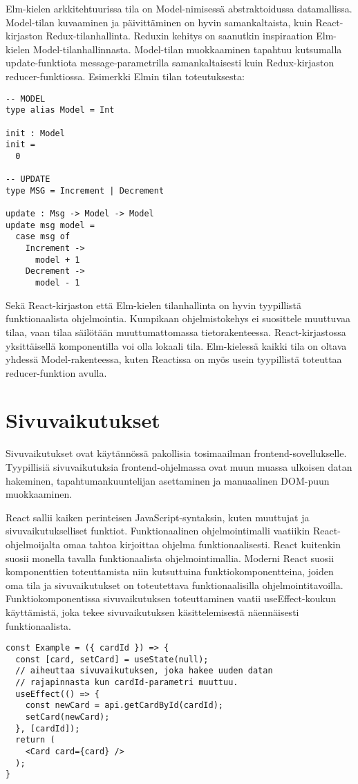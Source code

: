 Elm-kielen arkkitehtuurissa tila on Model-nimisessä abstraktoidussa datamallissa. Model-tilan kuvaaminen ja
päivittäminen on hyvin samankaltaista, kuin React-kirjaston Redux-tilanhallinta. Reduxin kehitys on saanutkin
inspiraation Elm-kielen Model-tilanhallinnasta. Model-tilan muokkaaminen tapahtuu kutsumalla update-funktiota
message-parametrilla samankaltaisesti kuin Redux-kirjaston reducer-funk\-tiossa. \cite{elmlang} Esimerkki Elmin tilan
toteutuksesta:
\begin{verbatim}
-- MODEL
type alias Model = Int

init : Model
init =
  0

-- UPDATE
type MSG = Increment | Decrement

update : Msg -> Model -> Model
update msg model =
  case msg of
    Increment ->
      model + 1
    Decrement ->
      model - 1
\end{verbatim}

Sekä React-kirjaston että Elm-kielen tilanhallinta on hyvin tyypillistä funktionaalista ohjelmointia. Kumpikaan
ohjelmistokehys ei suosittele muuttuvaa tilaa, vaan tilaa säilötään muuttumattomassa tietorakenteessa. React-kirjastossa
yksittäisellä komponentilla voi olla lokaali tila. Elm-kielessä kaikki tila on oltava yhdessä Model-rakenteessa, kuten
Reactissa on myös usein tyypillistä toteuttaa reducer-funktion avulla.

\section{Sivuvaikutukset}
Sivuvaikutukset ovat käytännössä pakollisia tosimaailman frontend-sovellukselle. Tyypillisiä sivuvaikutuksia
frontend-ohjelmassa ovat muun muassa ulkoisen datan hakeminen, tapahtumankuuntelijan asettaminen ja manuaalinen DOM-puun
muokkaaminen.

React sallii kaiken perinteisen JavaScript-syntaksin, kuten muuttujat ja sivuvaikutukselliset funktiot. Funktionaalinen
ohjelmointimalli vaatiikin React-ohjelmoijalta omaa tahtoa kirjoittaa ohjelma funktionaalisesti. React kuitenkin suosii
monella tavalla funktionaalista ohjelmointimallia. Moderni React suosii komponenttien toteuttamista niin kutsuttuina
funktiokomponentteina, joiden oma tila ja sivuvaikutukset on toteutettava funktionaalisilla ohjelmointitavoilla.
Funktiokomponentissa sivuvaikutuksen toteuttaminen vaatii useEffect-koukun käyttämistä, joka tekee sivuvaikutuksen
käsittelemisestä näennäisesti funktionaalista. \cite{reactjs}
\begin{verbatim}
const Example = ({ cardId }) => {
  const [card, setCard] = useState(null);
  // aiheuttaa sivuvaikutuksen, joka hakee uuden datan
  // rajapinnasta kun cardId-parametri muuttuu.
  useEffect(() => {
    const newCard = api.getCardById(cardId);
    setCard(newCard);
  }, [cardId]);
  return (
    <Card card={card} />
  );
}
\end{verbatim}

